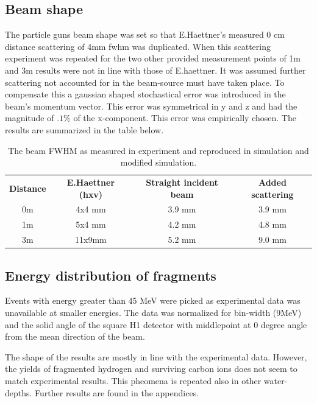 \subsection{Beam shape}
The particle guns beam shape was set so that E.Haettner's measured 0 cm distance scattering of 4mm fwhm was duplicated. When this scattering experiment was repeated for the two other provided measurement points of 1m and 3m results were not in line with those of E.haettner. It was assumed further scattering not accounted for in the beam-source must have taken place. To compensate this a gaussian shaped stochastical error was introduced in the beam's momentum vector. This error was symmetrical in y and z and had the magnitude of $.1 \%$ of the x-component. This error was empirically chosen. The results are summarized in the table below.
\begin{center}
 \begin{table}[h]
\begin{tabular}{cccc} %
\textbf{Distance} & \textbf{E.Haettner (hxv)} & \textbf{Straight incident beam} & \textbf{Added scattering} \\
0m &4x4 mm& 3.9 mm & 3.9 mm\\
1m &5x4 mm & 4.2 mm & 4.8 mm\\
3m &11x9mm& 5.2 mm & 9.0 mm\\
\end{tabular} 
\caption{\label{fig:beamFWHMtable} The beam FWHM as measured in experiment and reproduced in simulation and modified simulation.}
\end{table}
\end{center}


\subsection{Energy distribution of fragments}
Events with energy greater than 45 MeV were picked as experimental data was unavailable at smaller energies. The data was normalized for bin-width (9MeV) and the solid angle of the square H1 detector with middlepoint at 0 degree angle from the mean direction of the beam.

The shape of the results are mostly in line with the experimental data. However, the yields of fragmented hydrogen and surviving carbon ions does not seem to match experimental results. This pheomena is repeated also in other water-depths. Further results are found in the appendices.

